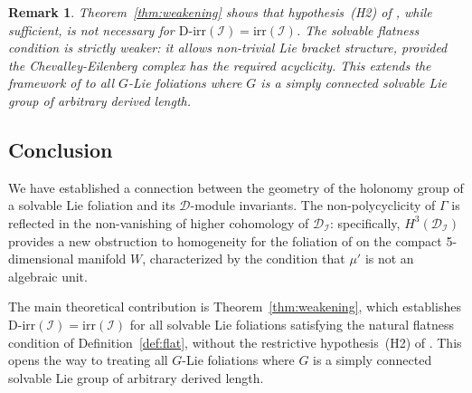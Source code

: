 \documentclass[12pt,a4paper]{article}
\newtheorem{remark}[theorem]{Remark}
\begin{document}
\begin{remark}
Theorem~\ref{thm:weakening} shows that hypothesis~(H2) of \cite{D16},
while sufficient, is not necessary for
$\mathrm{D\text{-}irr}(\mathcal{I}) = \mathrm{irr}(\mathcal{I})$.
The solvable flatness condition is strictly weaker: it allows non-trivial
Lie bracket structure, provided the Chevalley-Eilenberg complex has the
required acyclicity. This extends the framework of \cite{D16} to all
$G$-Lie foliations where $G$ is a simply connected solvable Lie group of
arbitrary derived length.
\end{remark}

\subsection*{Conclusion}

We have established a connection between the geometry of the holonomy group
of a solvable Lie foliation and its $\mathcal{D}$-module invariants. The
non-polycyclicity of $\Gamma$ is reflected in the non-vanishing of higher
cohomology of $\mathcal{D}_{\mathcal{I}}$: specifically, $H^3
(\mathcal{D}_{\mathcal{I}})$ provides a new obstruction to homogeneity
for the foliation of \cite{DN11} on the compact 5-dimensional manifold $W$,
characterized by the condition that $\mu'$ is not an algebraic unit.

The main theoretical contribution is Theorem~\ref{thm:weakening}, which
establishes
$\mathrm{D\text{-}irr}(\mathcal{I}) = \mathrm{irr}(\mathcal{I})$
for all solvable Lie foliations satisfying the natural flatness condition
of Definition~\ref{def:flat}, without the restrictive hypothesis~(H2)
of \cite{D16}. This opens the way to treating all $G$-Lie foliations
where $G$ is a simply connected solvable Lie group of arbitrary derived
length.
\end{document}
